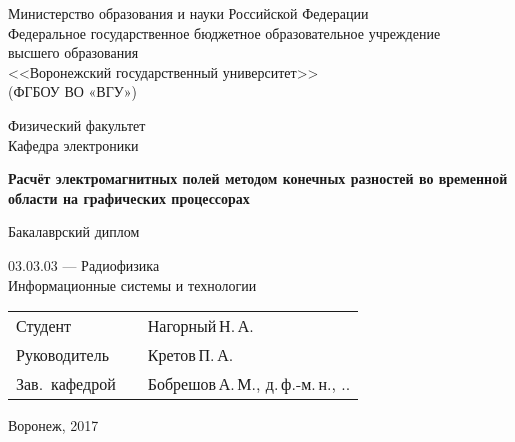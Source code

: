 \begin{titlepage}

\centering
Министерство образования и науки Российской Федерации\\
Федеральное государственное бюджетное образовательное учреждение\\
высшего образования\\
<<Воронежский государственный университет>>\\
(ФГБОУ ВО «ВГУ»)

\vspace{20mm}

Физический факультет\\
Кафедра электроники

\vspace{35mm}

\textbf{
    Расчёт электромагнитных полей методом конечных разностей во временной области на графических процессорах}

\vspace{15mm}

Бакалаврский диплом\\

\vspace{10mm}

03.03.03 --- Радиофизика\\
Информационные системы и технологии\\

\vspace{20mm}

\begin{tabularx}{\textwidth}{lll}
Студент       & \hspace{35mm} & Нагорный\,Н.\,А.\\
Руководитель  & \hspace{35mm} &  Кретов\,П.\,А.\\
Зав.~кафедрой & \hspace{35mm} & Бобрешов\,А.\,М., д.\,ф.-м.\,н.,
\underline{\hspace{5mm}}.\underline{\hspace{5mm}}.\underline{\hspace{10mm}}\\
\end{tabularx}

\vspace*{\fill}

Воронеж, 2017

\end{titlepage}

\setcounter{page}{2}